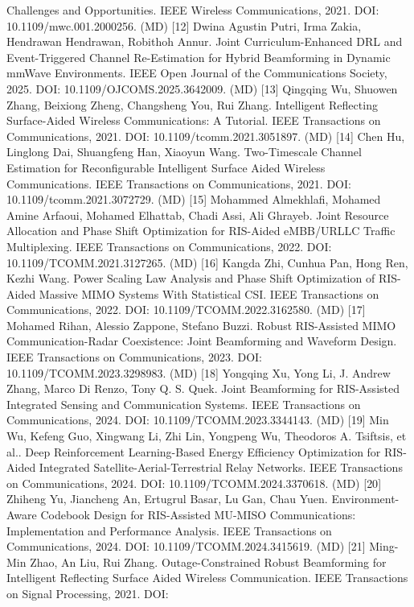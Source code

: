 \documentclass[10pt,twocolumn]{article}
\begin{document}
Challenges and Opportunities. IEEE Wireless Communications, 2021. DOI:
10.1109/mwc.001.2000256. (MD) {[}12{]} Dwina Agustin Putri, Irma Zakia,
Hendrawan Hendrawan, Robithoh Annur. Joint Curriculum-Enhanced DRL and
Event-Triggered Channel Re-Estimation for Hybrid Beamforming in Dynamic
mmWave Environments. IEEE Open Journal of the Communications Society,
2025. DOI: 10.1109/OJCOMS.2025.3642009. (MD) {[}13{]} Qingqing Wu,
Shuowen Zhang, Beixiong Zheng, Changsheng You, Rui Zhang. Intelligent
Reflecting Surface-Aided Wireless Communications: A Tutorial. IEEE
Transactions on Communications, 2021. DOI: 10.1109/tcomm.2021.3051897.
(MD) {[}14{]} Chen Hu, Linglong Dai, Shuangfeng Han, Xiaoyun Wang.
Two-Timescale Channel Estimation for Reconfigurable Intelligent Surface
Aided Wireless Communications. IEEE Transactions on Communications,
2021. DOI: 10.1109/tcomm.2021.3072729. (MD) {[}15{]} Mohammed
Almekhlafi, Mohamed Amine Arfaoui, Mohamed Elhattab, Chadi Assi, Ali
Ghrayeb. Joint Resource Allocation and Phase Shift Optimization for
RIS-Aided eMBB/URLLC Traffic Multiplexing. IEEE Transactions on
Communications, 2022. DOI: 10.1109/TCOMM.2021.3127265. (MD) {[}16{]}
Kangda Zhi, Cunhua Pan, Hong Ren, Kezhi Wang. Power Scaling Law Analysis
and Phase Shift Optimization of RIS-Aided Massive MIMO Systems With
Statistical CSI. IEEE Transactions on Communications, 2022. DOI:
10.1109/TCOMM.2022.3162580. (MD) {[}17{]} Mohamed Rihan, Alessio
Zappone, Stefano Buzzi. Robust RIS-Assisted MIMO Communication-Radar
Coexistence: Joint Beamforming and Waveform Design. IEEE Transactions on
Communications, 2023. DOI: 10.1109/TCOMM.2023.3298983. (MD) {[}18{]}
Yongqing Xu, Yong Li, J. Andrew Zhang, Marco Di Renzo, Tony Q. S. Quek.
Joint Beamforming for RIS-Assisted Integrated Sensing and Communication
Systems. IEEE Transactions on Communications, 2024. DOI:
10.1109/TCOMM.2023.3344143. (MD) {[}19{]} Min Wu, Kefeng Guo, Xingwang
Li, Zhi Lin, Yongpeng Wu, Theodoros A. Tsiftsis, et al.. Deep
Reinforcement Learning-Based Energy Efficiency Optimization for
RIS-Aided Integrated Satellite-Aerial-Terrestrial Relay Networks. IEEE
Transactions on Communications, 2024. DOI: 10.1109/TCOMM.2024.3370618.
(MD) {[}20{]} Zhiheng Yu, Jiancheng An, Ertugrul Basar, Lu Gan, Chau
Yuen. Environment-Aware Codebook Design for RIS-Assisted MU-MISO
Communications: Implementation and Performance Analysis. IEEE
Transactions on Communications, 2024. DOI: 10.1109/TCOMM.2024.3415619.
(MD) {[}21{]} Ming-Min Zhao, An Liu, Rui Zhang. Outage-Constrained
Robust Beamforming for Intelligent Reflecting Surface Aided Wireless
Communication. IEEE Transactions on Signal Processing, 2021. DOI:
\end{document}
